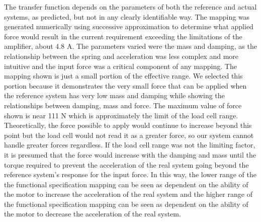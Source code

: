 The transfer function depends on the parameters of both the reference and actual systems, as predicted, but not in any clearly identifiable way. The mapping was generated numerically using successive approximation to determine what applied force would result in the current requirement exceeding the limitations of the amplifier, about 4.8 A. The parameters varied were the mass and damping, as the relationship between the spring and acceleration was less complex and more intuitive and the input force was a critical component of any mapping.
The mapping shown is just a small portion of the effective range. We selected this portion because it demonstrates the very small force that can be applied when the reference system has very low mass and damping while showing the relationships between damping, mass and force. The maximum value of force shown is near 111 N which is approximately the limit of the load cell range. Theoretically, the force possible to apply would continue to increase beyond this point but the load cell would not read it as a greater force, so our system cannot handle greater forces regardless. If the load cell range was not the limiting factor, it is presumed that the force would increase with the damping and mass until the torque required to prevent the acceleration of the real system going beyond the reference system's response for the input force. In this way, the lower range of the the functional specification mapping can be seen as dependent on the ability of the motor to increase the acceleration of the real system and the higher range of the functional specification mapping can be seen as dependent on the ability of the motor to decrease the acceleration of the real system.